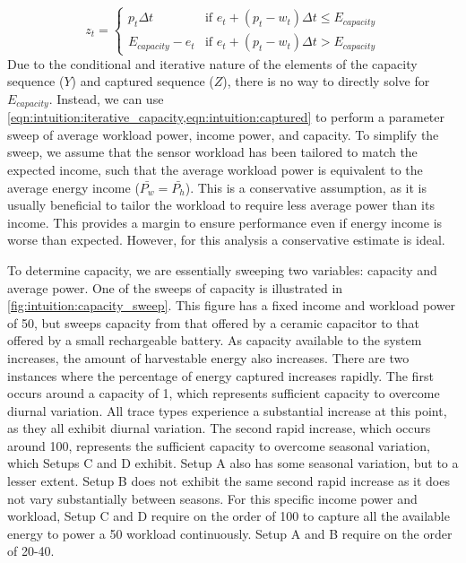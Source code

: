 \begin{equation} \label{eqn:intuition:captured}
    z_t = \begin{cases}
        p_t \Delta t & \text{if $e_t + (p_t - w_t) \Delta t \leq E_{capacity}$} \\
        E_{capacity} - e_t & \text{if $e_t + (p_t - w_t) \Delta t > E_{capacity}$} 
    \end{cases}
\end{equation}
Due to the conditional and iterative nature of the elements of the capacity sequence ($Y$) and captured sequence ($Z$), there is no way to directly solve for $E_{capacity}$.
Instead, we can use \cref{eqn:intuition:iterative_capacity,eqn:intuition:captured} to perform a parameter sweep of average workload power, income power, and capacity.
To simplify the sweep, we assume that the sensor workload has been tailored to match the expected income, such that the average workload power is equivalent to the average energy income ($\bar{P_w} = \bar{P_h}$). 
This is a conservative assumption, as it is usually beneficial to tailor the workload to require less average power than its income. 
This provides a margin to ensure performance even if energy income is worse than expected. However, for this analysis a conservative estimate is ideal.

To determine capacity, we are essentially sweeping two variables: capacity and average power.
One of the sweeps of capacity is illustrated in \cref{fig:intuition:capacity_sweep}. 
This figure has a fixed income and workload power of 50\ssi{\micro\watt}, but sweeps capacity from that offered by a ceramic capacitor to that offered by a small rechargeable battery.
As capacity available to the system increases, the amount of harvestable energy also increases.
There are two instances where the percentage of energy captured increases rapidly. The first occurs around a capacity of 1\ssi{\milli\Wh}, which represents sufficient capacity to overcome diurnal variation. All trace types experience a substantial increase at this point, as they all exhibit diurnal variation. 
The second rapid increase, which occurs around 100\ssi{\milli\Wh}, represents the sufficient capacity to overcome seasonal variation, which Setups C and D exhibit. Setup A also has some seasonal variation, but to a lesser extent. Setup B does not exhibit the same second rapid increase as it does not vary substantially between seasons.
For this specific income power and workload, Setup C and D require on the order of 100\ssi{\milli\Wh} to capture all the available energy to power a 50\ssi{\micro\watt} workload continuously. Setup A and B require on the order of 20-40\ssi{\milli\Wh}.

